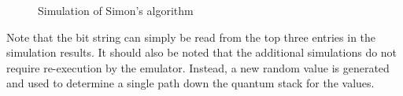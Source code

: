 \begin{figure}[htbp]
\caption{Simulation of  Simon's algorithm}\label{fig:emsimonsims}
\end{figure}

Note that the bit string can simply be read from the top three entries 
in the simulation results. It should also be noted that the additional
simulations do not require re-execution by the emulator. Instead, a new
random value is generated and used to determine a single path down the 
quantum stack for the values.




